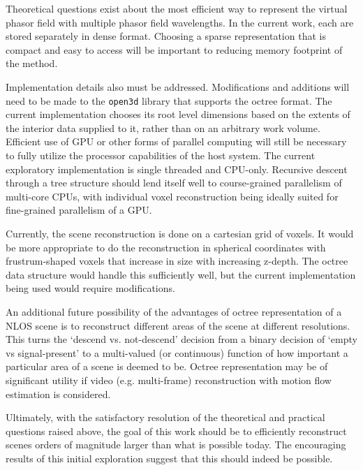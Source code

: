 \documentclass[conference]{IEEEtran}
\begin{document}
Theoretical questions exist about the most efficient way to represent the virtual phasor field with multiple phasor field wavelengths. In the current work, each are stored separately in dense format. Choosing a sparse representation that is compact and easy to access will be important to  reducing memory footprint of the method. 

Implementation details also must be addressed. Modifications and additions will need to be made to the \texttt{open3d} library that supports the octree format. The current implementation chooses its root level dimensions based on the extents of the interior data supplied to it, rather than on an arbitrary work volume. Efficient use of GPU or other forms of parallel computing will still be necessary to fully utilize the processor capabilities of the host system. The current exploratory implementation is single threaded and CPU-only. Recursive descent through a tree structure should lend itself well to course-grained parallelism of multi-core CPUs, with individual voxel reconstruction being ideally suited for fine-grained parallelism of a GPU.

Currently, the scene reconstruction is done on a cartesian grid of voxels. It would be more appropriate to do the reconstruction in spherical coordinates with frustrum-shaped voxels that increase in size with increasing z-depth. The octree data structure would handle this sufficiently well, but the current implementation being used would require modifications.

An additional future possibility of the advantages of octree representation of a NLOS scene is to reconstruct different areas of the scene at different resolutions. This turns the `descend vs. not-descend' decision from a binary decision of `empty vs signal-present' to a multi-valued (or continuous) function of how important a particular area of a scene is deemed to be. Octree representation may be of significant utility if video (e.g. multi-frame) reconstruction with motion flow estimation is considered.

Ultimately, with the satisfactory resolution of the theoretical and practical questions raised above, the goal of this work should be to efficiently reconstruct scenes orders of magnitude larger than what is possible today. The encouraging results of this initial exploration suggest that this should indeed be possible.



\end{document}
